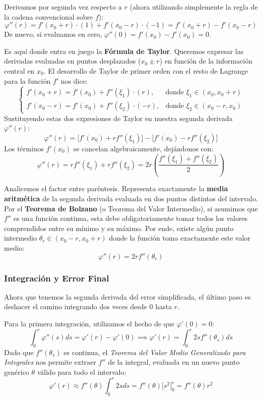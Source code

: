 Derivamos por segunda vez respecto a $r$ (ahora utilizando simplemente la regla de la cadena convencional sobre $f$):
\[
    \varphi''(r) = f'(x_0 + r) \cdot (1) + f'(x_0 - r) \cdot (-1) = f'(x_0 + r) - f'(x_0 - r)
\]
De nuevo, si evaluamos en cero, $\varphi''(0) = f'(x_0) - f'(x_0) = 0$.

Es aquí donde entra en juego la \textbf{Fórmula de Taylor}. Queremos expresar las derivadas evaluadas en puntos desplazados ($x_0 \pm r$) en función de la información central en $x_0$. El desarrollo de Taylor de primer orden con el resto de Lagrange para la función $f'$ nos dice:
\[
    \begin{cases}
        f'(x_0 + r) = f'(x_0) + f''(\xi_1) \cdot (r), & \text{donde } \xi_1 \in (x_0, x_0 + r) \\
        f'(x_0 - r) = f'(x_0) + f''(\xi_2) \cdot (-r), & \text{donde } \xi_2 \in (x_0 - r, x_0)
    \end{cases}
\]
Sustituyendo estas dos expresiones de Taylor en nuestra segunda derivada $\varphi''(r)$:
\[
    \varphi''(r) = \Big[ f'(x_0) + r f''(\xi_1) \Big] - \Big[ f'(x_0) - r f''(\xi_2) \Big]
\]
Los términos $f'(x_0)$ se cancelan algebraicamente, dejándonos con:
\[
    \varphi''(r) = r f''(\xi_1) + r f''(\xi_2) = 2r \left( \frac{f''(\xi_1) + f''(\xi_2)}{2} \right)
\]

Analicemos el factor entre paréntesis. Representa exactamente la \textbf{media aritmética} de la segunda derivada evaluada en dos puntos distintos del intervalo. Por el \textbf{Teorema de Bolzano} (o Teorema del Valor Intermedio), si asumimos que $f''$ es una función continua, esta debe obligatoriamente tomar todos los valores comprendidos entre su mínimo y su máximo. Por ende, existe algún punto intermedio $\theta_r \in (x_0-r, x_0+r)$ donde la función toma exactamente este valor medio:
\[
    \varphi''(r) = 2r f''(\theta_r)
\]

\subsubsection{Integración y Error Final}

Ahora que tenemos la segunda derivada del error simplificada, el último paso es deshacer el camino integrando dos veces desde $0$ hasta $r$. 

Para la primera integración, utilizamos el hecho de que $\varphi'(0) = 0$:
\[
    \int_0^r \varphi''(s) ds = \varphi'(r) - \varphi'(0) \implies \varphi'(r) = \int_0^r 2s f''(\theta_s) ds
\]
Dado que $f''(\theta_s)$ es continua, el \textit{Teorema del Valor Medio Generalizado para Integrales} nos permite extraer $f''$ de la integral, evaluada en un nuevo punto genérico $\theta$ válido para todo el intervalo:
\[
    \varphi'(r) \approx f''(\theta) \int_0^r 2s ds = f''(\theta) \Big[ s^2 \Big]_0^r = f''(\theta) r^2
\]

